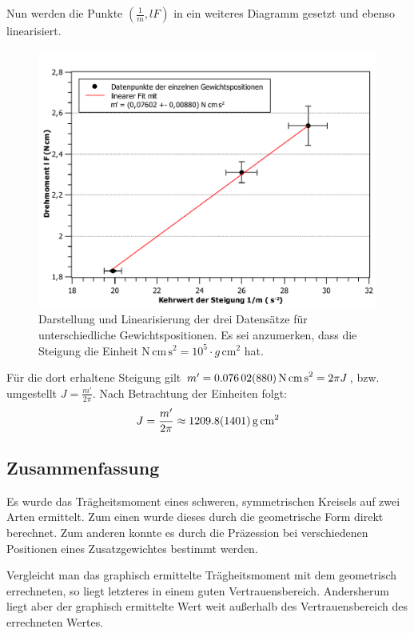 Nun werden die Punkte $(\frac{1}{m}, lF)$ in ein weiteres Diagramm gesetzt und ebenso linearisiert.
\begin{figure}[ht]
	\centering
	\includegraphics[width=\textwidth]{auswertung/kreisel_gewichte.pdf}
	\caption{Darstellung und Linearisierung der drei Datensätze für unterschiedliche Gewichtspositionen. Es sei anzumerken, dass die Steigung die Einheit $\si{\newton\,\centi\meter\,\second\squared} = 10^5\cdot \si{g\,\centi\meter^2}$ hat.}
	\label{abb:gewichte}	
\end{figure}
Für die dort erhaltene Steigung gilt $m' = \SI{0,07602 +- 0,00880}{\newton\,\centi\meter\,\second\squared} = 2\pi J$, bzw. umgestellt $J = \frac{m'}{2\pi}$.
Nach Betrachtung der Einheiten folgt:
\begin{equation}
J = \frac{m'}{2\pi} \approx \SI{1209,8 +- 140,1}{g\,\centi\meter\squared}
\end{equation}


\subsection{Zusammenfassung}

Es wurde das Trägheitsmoment eines schweren, symmetrischen Kreisels auf zwei Arten ermittelt.
Zum einen wurde dieses durch die geometrische Form direkt berechnet.
Zum anderen konnte es durch die Präzession bei verschiedenen Positionen eines Zusatzgewichtes bestimmt werden.

Vergleicht man das graphisch ermittelte Trägheitsmoment mit dem geometrisch errechneten, so liegt letzteres in einem guten Vertrauensbereich.
Andersherum liegt aber der graphisch ermittelte Wert weit außerhalb des Vertrauensbereich des errechneten Wertes.

